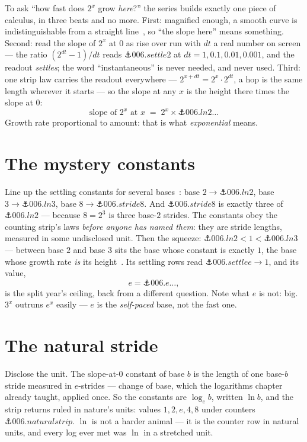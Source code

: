 \begin{narrative}
To ask ``how fast does $2^x$ grow \emph{here}?'' the series builds
exactly one piece of calculus, in three beats and no more. First:
magnified enough, a smooth curve is indistinguishable from a straight
line~\cite{calculus-david-tall-cognitive-roots}, so ``the slope
here'' means something. Second: read the slope of $2^x$ at $0$ as
rise over run with $dt$ a real number on screen — the ratio
$(2^{dt} - 1)/dt$ reads $\anchor{006.settle2}$ at
$dt = 1, 0.1, 0.01, 0.001$, and the readout \emph{settles}; the word
``instantaneous'' is never needed, and never used. Third: one strip
law carries the readout everywhere — $2^{x+dt} = 2^x \cdot 2^{dt}$, a
hop is the same length wherever it starts — so the slope at any $x$
is the height there times the slope at $0$:
\[
  \text{slope of } 2^x \text{ at } x
  \;=\; 2^x \times \anchor{006.ln2}\ldots
\]
Growth rate proportional to amount: that is what \emph{exponential}
means.

\section{The mystery constants}

Line up the settling constants for several
bases~\cite{calculus-3blue1brown-what-s-so-special-about-euler-s-number-e}:
base $2 \to \anchor{006.ln2}$, base $3 \to \anchor{006.ln3}$, base
$8 \to \anchor{006.stride8}$. And $\anchor{006.stride8}$ is exactly
three of $\anchor{006.ln2}$ — because $8 = 2^3$ is three base-$2$
strides. The constants obey the counting strip's laws \emph{before
anyone has named them}: they are stride lengths, measured in some
undisclosed unit. Then the squeeze:
$\anchor{006.ln2} < 1 < \anchor{006.ln3}$ — between base $2$ and base
$3$ sits the base whose constant is exactly $1$, the base whose growth
rate \emph{is} its height~\cite{calculus-openstax-calculus-vol-1-3-9}.
Its settling rows read $\anchor{006.settlee} \to 1$, and its value,
\[
  e = \anchor{006.e}\ldots,
\]
is the split year's ceiling, back from a different question. Note what
$e$ is not: big. $3^x$ outruns $e^x$ easily — $e$ is the
\emph{self-paced} base, not the fast one.

\section{The natural stride}

Disclose the unit. The slope-at-$0$ constant of base $b$ is the length
of one base-$b$ stride measured in $e$-strides — change of base, which
the logarithms chapter already taught, applied once. So the constants
are $\log_e b$, written $\ln b$, and the strip returns ruled in
nature's units: values $1, 2, e, 4, 8$ under counters
$\anchor{006.naturalstrip}$. $\ln$ is not a harder animal — it is the
counter row in natural units, and every log ever met was $\ln$ in a
stretched unit.


\end{narrative}
